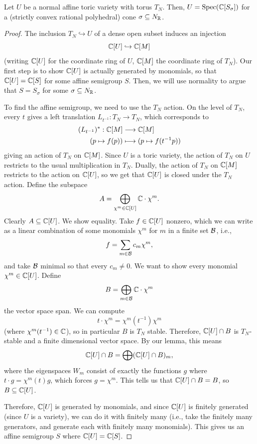 \documentclass[12pt]{article}
\begin{document}
\begin{prop}
    Let $U$ be a normal affine toric variety with torus $T_N$. Then, $U=\operatorname{Spec}(\mathbb{C}[S_\sigma])$ for a (strictly convex rational polyhedral) cone $\sigma\subseteq N_{\mathbb{R}}$.
\end{prop}

\begin{proof}
    The inclusion $T_N \hookrightarrow U$ of a dense open subset induces an injection
    \[\mathbb{C}[U] \hookrightarrow \mathbb{C}[M]\]
    (writing $\mathbb{C}[U]$ for the coordinate ring of $U$, $\mathbb{C}[M]$ the coordinate ring of $T_N$). Our first step is to show $\mathbb{C}[U]$ is actually generated by monomials, so that $\mathbb{C}[U] = \mathbb{C}[S]$ for some affine semigroup $S$. Then, we will use normality to argue that $S=S_\sigma$ for some $\sigma \subseteq N_{\mathbb{R}}$.

    To find the affine semigroup, we need to use the $T_N$ action. On the level of $T_N$, every $t$ gives a left translation $L_{t^{-1}}: T_N \to T_N$, which corresponds to
    \begin{align*}
        (L_{t^{-1}})^*: \mathbb{C}[M] &\longrightarrow \mathbb{C}[M]\\
        (p\mapsto f(p)) &\longmapsto (p\mapsto f(t^{-1} p))
    \end{align*}
    giving an action of $T_N$ on $\mathbb{C}[M]$. Since $U$ is a toric variety, the action of $T_N$ on $U$ restricts to the usual multiplication in $T_N$. Dually, the action of $T_N$ on $\mathbb{C}[M]$ restricts to the action on $\mathbb{C}[U]$, so we get that $\mathbb{C}[U]$ is closed under the $T_N$ action. Define the subspace
    \[A = \bigoplus_{\chi^m \in \mathbb{C}[U]} \mathbb{C}\cdot \chi^m.\]
    Clearly $A\subseteq \mathbb{C}[U]$. We show equality. Take $f\in \mathbb{C}[U]$ nonzero, which we can write as a linear combination of some monomials $\chi^m$ for $m$ in a finite set $\mathcal{B}$, i.e.,
    \[f = \sum_{m\in \mathcal{B}} c_m \chi^m,\]
    and take $\mathcal{B}$ minimal so that every $c_m\neq 0$. We want to show every monomial $\chi^m \in \mathbb{C}[U]$. Define
    \[B = \bigoplus_{m\in \mathcal{B}} \mathbb{C}\cdot \chi^m\]
    the vector space span. We can compute
    \[t\cdot \chi^m = \chi^m(t^{-1}) \chi^m\]
    (where $\chi^m(t^{-1})\in \mathbb{C}$), so in particular $B$ is $T_N$ stable. Therefore, $\mathbb{C}[U]\cap B$ is $T_N$-stable and a finite dimensional vector space. By our lemma, this means
    \[\mathbb{C}[U]\cap B = \bigoplus (\mathbb{C}[U] \cap B)_m,\]
    where the eigenspaces $W_m$ consist of exactly the functions $g$ where $t\cdot g = \chi^m(t) g$, which forces $g=\chi^m$. This tells us that $\mathbb{C}[U]\cap B = B$, so $B\subseteq \mathbb{C}[U]$.

    Therefore, $\mathbb{C}[U]$ is generated by monomials, and since $\mathbb{C}[U]$ is finitely generated (since $U$ is a variety), we can do it with finitely many (i.e., take the finitely many generators, and generate each with finitely many monomials). This gives us an affine semigroup $S$ where $\mathbb{C}[U]=\mathbb{C}[S]$.


\end{proof}
\end{document}
